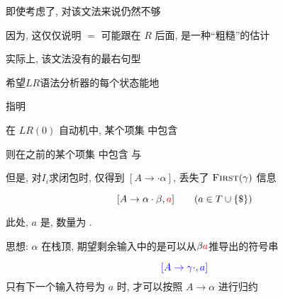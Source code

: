 \begin{frame}{}
  \begin{center}
    即使考虑了, 对该文法来说仍然不够

    \vspace{0.20cm}
    因为, 这仅仅说明 $=$ 可能跟在 $R$ 后面, 是一种``粗糙''的估计


    \pause
    实际上, 该文法没有的最右句型
  \end{center}
\end{frame}

\begin{frame}{}
  \begin{center}
    希望$LR$语法分析器的每个状态能地

    \vspace{0.30cm}
    指明

    \pause
    \vspace{1.00cm}
    在 $LR(0)$ 自动机中, 某个项集  中包含 

    \vspace{0.50cm}
    则在之前的某个项集  中包含 
    与 

    \pause
    \vspace{0.50cm}

    \pause
    \vspace{0.80cm}
    但是, 对$I_{i}$求闭包时, 仅得到 $[A \to \cdot \alpha]$, 丢失了 $\textsc{First}(\gamma)$ 信息
  \end{center}
\end{frame}

\begin{frame}{}
  \begin{center}
    \begin{definition}[$LR(1)$项 (Item)]
      \[
        [A \to \alpha \cdot \beta, \textcolor{red}{a}] \qquad (a \in T \cup \{\$\})
      \]

      此处, $a$ 是, 数量为 .
    \end{definition}

    \pause
    \vspace{0.80cm}
    思想: $\alpha$ 在栈顶, 期望剩余输入中的是可以从$\beta \textcolor{red}{a}$推导出的符号串

    \pause
    \vspace{0.50cm}
    \[
      \textcolor{blue}{[A \to \gamma \cdot, a]}
    \]
    只有下一个输入符号为 $a$ 时, 才可以按照 $A \to \alpha$ 进行归约
  \end{center}
\end{frame}

